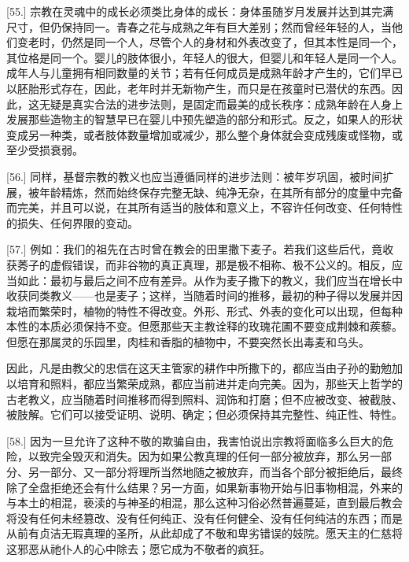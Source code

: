 [55.] 宗教在灵魂中的成长必须类比身体的成长：身体虽随岁月发展并达到其完满尺寸，但仍保持同一。青春之花与成熟之年有巨大差别；然而曾经年轻的人，当他们变老时，仍然是同一个人，尽管个人的身材和外表改变了，但其本性是同一个，其位格是同一个。婴儿的肢体很小，年轻人的很大，但婴儿和年轻人是同一个人。成年人与儿童拥有相同数量的关节；若有任何成员是成熟年龄才产生的，它们早已以胚胎形式存在，因此，老年时并无新物产生，而只是在孩童时已潜伏的东西。因此，这无疑是真实合法的进步法则，是固定而最美的成长秩序：成熟年龄在人身上发展那些造物主的智慧早已在婴儿中预先塑造的部分和形式。反之，如果人的形状变成另一种类，或者肢体数量增加或减少，那么整个身体就会变成残废或怪物，或至少受损衰弱。\par

[56.] 同样，基督宗教的教义也应当遵循同样的进步法则：被年岁巩固，被时间扩展，被年龄精炼，然而始终保存完整无缺、纯净无杂，在其所有部分的度量中完备而完美，并且可以说，在其所有适当的肢体和意义上，不容许任何改变、任何特性的损失、任何界限的变动。\par

[57.] 例如：我们的祖先在古时曾在教会的田里撒下麦子。若我们这些后代，竟收获莠子的虚假错误，而非谷物的真正真理，那是极不相称、极不公义的。相反，应当如此：最初与最后之间不应有差异。从作为麦子撒下的教义，我们应当在增长中收获同类教义——也是麦子；这样，当随着时间的推移，最初的种子得以发展并因栽培而繁荣时，植物的特性不得改变。外形、形式、外表的变化可以出现，但每种本性的本质必须保持不变。但愿那些天主教诠释的玫瑰花圃不要变成荆棘和蒺藜。但愿在那属灵的乐园里，肉桂和香脂的植物中，不要突然长出毒麦和乌头。\par

因此，凡是由教父的忠信在这天主管家的耕作中所撒下的，都应当由子孙的勤勉加以培育和照料，都应当繁荣成熟，都应当前进并走向完美。因为，那些天上哲学的古老教义，应当随着时间推移而得到照料、润饰和打磨；但不应被改变、被截肢、被肢解。它们可以接受证明、说明、确定；但必须保持其完整性、纯正性、特性。\par

[58.] 因为一旦允许了这种不敬的欺骗自由，我害怕说出宗教将面临多么巨大的危险，以致完全毁灭和消失。因为如果公教真理的任何一部分被放弃，那么另一部分、另一部分、又一部分将理所当然地随之被放弃，而当各个部分被拒绝后，最终除了全盘拒绝还会有什么结果？另一方面，如果新事物开始与旧事物相混，外来的与本土的相混，亵渎的与神圣的相混，那么这种习俗必然普遍蔓延，直到最后教会将没有任何未经篡改、没有任何纯正、没有任何健全、没有任何纯洁的东西；而是从前有贞洁无瑕真理的圣所，从此却成了不敬和卑劣错误的妓院。愿天主的仁慈将这邪恶从祂仆人的心中除去；愿它成为不敬者的疯狂。\par

